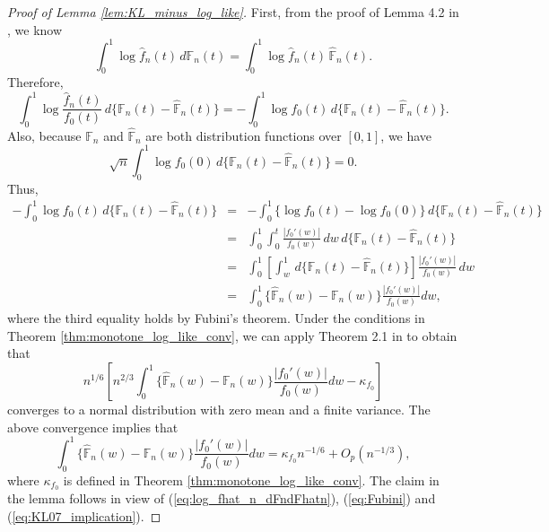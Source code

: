 \documentclass[12pt,letterpaper, twoside, openany]{article}
\theoremstyle{plain}
\begin{document}
\begin{proof}[Proof of Lemma \ref{lem:KL_minus_log_like}]
First, from the proof of Lemma 4.2 in \cite{Jankowski2014}, we know 
\begin{equation*}
	\int_0^1 \log \hat{f}_n(t) \,d\mathbb{F}_n(t) =\int_0^1 \log \hat{f}_n(t) \, \hat{\mathbb{F}}_n(t).	
\end{equation*}
Therefore,
\begin{equation}\label{eq:log_fhat_n_dFndFhatn}
	\int_0^1 \log \frac{\hat{f}_n(t)}{f_0(t)} \,d \{\mathbb{F}_n(t) - \hat{\mathbb{F}}_n(t)\} = 
	-\int_0^1 \log f_0(t) \,d \{ \mathbb{F}_n(t) - \hat{\mathbb{F}}_n(t)\}. 
\end{equation}
Also, because $\mathbb{F}_n$ and $\hat{\mathbb{F}}_n$ are both distribution functions over $[0,1]$, we have 
\begin{equation*}
	\sqrt{n} \int_0^1 \log f_0(0) \,d\{\mathbb{F}_n(t) - \hat{\mathbb{F}}_n(t)\} = 0.	
\end{equation*}
Thus,
\begin{eqnarray}
	-\int_0^1\log f_0(t)\,d\{\mathbb{F}_n(t) - \hat{\mathbb{F}}_n(t)\} 
	&=& -\int_0^1  \{\log f_0(t) - \log f_0(0)\} \,d \{ \mathbb{F}_n(t) - \hat{\mathbb{F}}_n(t)\} \nonumber\\
	&=& \int_0^1 \int_0^t \frac{|f_0'(w)|}{f_0(w)} \,dw \,d \{\mathbb{F}_n(t) - \hat{\mathbb{F}}_n(t)\} \nonumber \\
	&=& 	\int_0^1 \left[\int_w^1  \,d\{\mathbb{F}_n(t) - \hat{\mathbb{F}}_n(t)\} \right] \frac{|f_0'(w)|}{f_0(w)} \,dw \nonumber \\
	&=& \int_0^1 \{ \hat{\mathbb{F}}_n(w) - \mathbb{F}_n(w)\} \frac{|f_0'(w)|}{f_0(w)} dw, \label{eq:Fubini}
\end{eqnarray}
where the third equality holds by Fubini's theorem. Under the conditions in Theorem \ref{thm:monotone_log_like_conv}, we can apply Theorem 2.1 in \cite{Kulikov2008} to obtain that
\begin{equation*}
	n^{1/6}\left[ n^{2/3} \int_0^1 \{\hat{\mathbb{F}}_n(w) - \mathbb{F}_n(w)\} \frac{|f_0'(w)|}{f_0(w)} dw - \kappa_{f_0} \right]
\end{equation*}
converges to a normal distribution with zero mean and a finite variance.
The above convergence implies that
\begin{equation}\label{eq:KL07_implication}
	\int_0^1 \{\hat{\mathbb{F}}_n(w) - \mathbb{F}_n(w)\} \frac{|f_0'(w)|}{f_0(w)} dw = \kappa_{f_0} n^{-1/6} + O_p(n^{-1/3}),
\end{equation}
where $\kappa_{f_0}$ is defined in Theorem \ref{thm:monotone_log_like_conv}.
The claim in the lemma follows in view of (\ref{eq:log_fhat_n_dFndFhatn}), (\ref{eq:Fubini}) and (\ref{eq:KL07_implication}).
\end{proof}
\end{document}
